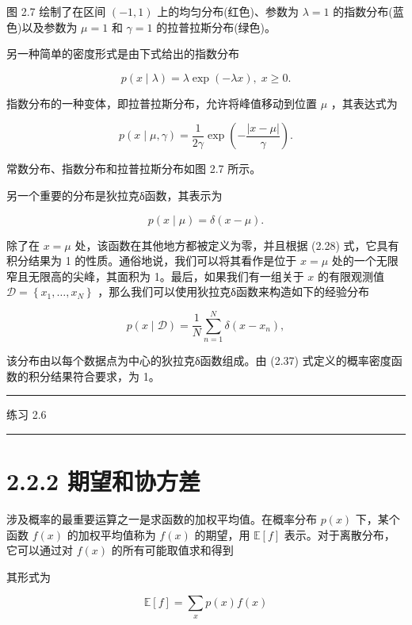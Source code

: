 \documentclass[10pt]{article}
\newcommand{\HRule}{\begin{center}\rule{0.9\linewidth}{0.2mm}\end{center}}
\begin{document}
图 2.7 绘制了在区间 \(\left( {-1,1}\right)\) 上的均匀分布(红色)、参数为 \(\lambda  = 1\) 的指数分布(蓝色)以及参数为 \(\mu  = 1\) 和 \(\gamma  = 1\) 的拉普拉斯分布(绿色)。

另一种简单的密度形式是由下式给出的指数分布

\[
p\left( {x \mid  \lambda }\right)  = \lambda \exp \left( {-{\lambda x}}\right) ,\;x \geq  0. \tag{2.34}
\]

指数分布的一种变体，即拉普拉斯分布，允许将峰值移动到位置 \(\mu\) ，其表达式为

\[
p\left( {x \mid  \mu ,\gamma }\right)  = \frac{1}{2\gamma }\exp \left( {-\frac{\left| x - \mu \right| }{\gamma }}\right) . \tag{2.35}
\]

常数分布、指数分布和拉普拉斯分布如图 2.7 所示。

另一个重要的分布是狄拉克δ函数，其表示为

\[
p\left( {x \mid  \mu }\right)  = \delta \left( {x - \mu }\right) . \tag{2.36}
\]

除了在 \(x = \mu\) 处，该函数在其他地方都被定义为零，并且根据 (2.28) 式，它具有积分结果为 1 的性质。通俗地说，我们可以将其看作是位于 \(x = \mu\) 处的一个无限窄且无限高的尖峰，其面积为 1。最后，如果我们有一组关于 \(x\) 的有限观测值 \(\mathcal{D} = \left\{  {{x}_{1},\ldots ,{x}_{N}}\right\}\) ，那么我们可以使用狄拉克δ函数来构造如下的经验分布

\[
p\left( {x \mid  \mathcal{D}}\right)  = \frac{1}{N}\mathop{\sum }\limits_{{n = 1}}^{N}\delta \left( {x - {x}_{n}}\right) , \tag{2.37}
\]

该分布由以每个数据点为中心的狄拉克δ函数组成。由 (2.37) 式定义的概率密度函数的积分结果符合要求，为 1。

\HRule

练习 2.6

\HRule

\section*{2.2.2 期望和协方差}

涉及概率的最重要运算之一是求函数的加权平均值。在概率分布 \(p\left( x\right)\) 下，某个函数 \(f\left( x\right)\) 的加权平均值称为 \(f\left( x\right)\) 的期望，用 \(\mathbb{E}\left\lbrack  f\right\rbrack\) 表示。对于离散分布，它可以通过对 \(f\left( x\right)\) 的所有可能取值求和得到

其形式为

\[
\mathbb{E}\left\lbrack  f\right\rbrack   = \mathop{\sum }\limits_{x}p\left( x\right) f\left( x\right)  \tag{2.38}
\]
\end{document}
